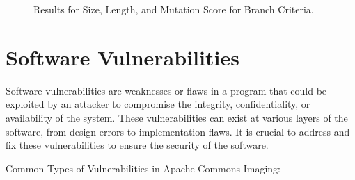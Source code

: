 \documentclass[sigconf]{acmart}
\begin{document}
\begin{figure}
    \centering
    \caption{Results for Size, Length, and Mutation Score for Branch Criteria.}
\end{figure}

\section{Software Vulnerabilities}
Software vulnerabilities are weaknesses or flaws in a program that could be exploited by an attacker to compromise the integrity, confidentiality, or availability of the system. These vulnerabilities can exist at various layers of the software, from design errors to implementation flaws. It is crucial to address and fix these vulnerabilities to ensure the security of the software.


Common Types of Vulnerabilities in Apache Commons Imaging:
\end{document}
